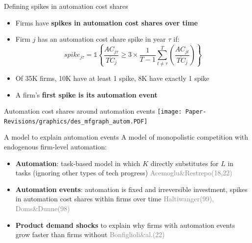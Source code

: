 \documentclass[aspectratio=169]{beamer}
\begin{document}
\begin{frame}{Defining spikes in automation cost shares} \label{spikes}
\noindent 
\begin{itemize}
\item Firms have \textbf{spikes in automation cost shares over time} \medskip 
\item Firm $j$ has an automation cost share spike in year  $\tau$ if:
\begin{equation*} 
spike_{j\tau} = \mathbb{1}\left\{ \frac{AC_{j\tau}}{\overline{TC}_{j}}\geq3\times \frac{1}{T-1} \sum_{t \neq \tau}^{T}\left(\frac{{AC}_{jt}}{\overline{TC}_{j}}\right)\right\}
\end{equation*}
\item Of 35K firms, 10K have at least 1 spike, 8K have exactly 1 spike \hyperlink{spikefrequency}{} \medskip
\item A firm's \textbf{first spike is its automation event}
\end{itemize}
\end{frame}

\begin{frame}{Automation cost shares around automation events}
\centering
\texttt{[image: Paper-Revisions/graphics/des\_mfgraph\_autom.PDF]}
\end{frame}

\begin{frame}{A model to explain automation events \hyperlink{modelA}{}} \label{model} 
A model of monopolistic competition with endogenous firm-level automation: \medskip
\begin{itemize}
    \item \textbf{Automation}: task-based model in which $K$ directly substitutes for $L$ in tasks (ignoring other types of tech progress) \textcolor{gray}{\scriptsize{Acemoglu\&Restrepo(18,22)}} \medskip
    \item \textbf{Automation events}: automation is fixed and irreversible investment, spikes in automation cost shares within firms over time \textcolor{gray}{\scriptsize{Haltiwanger(99), Doms\&Dunne(98)}} \medskip
    \item \textbf{Product demand shocks} to explain why firms with automation events grow faster than firms without \textcolor{gray}{\scriptsize{Bonfiglioli\&al.(22)}}
\end{itemize}
\end{frame}
\end{document}
